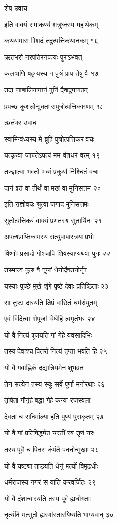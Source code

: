 शेष उवाच

इति वाक्यं समाकर्ण्य शत्रुघ्नस्य महार्थकम्

कथयामास विशदं तदुत्पत्तिकथानकम् १६

ऋतंभरो नरपतिरनपत्यः पुराऽभवत्

कलत्राणि बहून्यस्य न पुत्रं प्राप तेषु वै १७

तदा जाबालिनामानं मुनिं दैवादुपागतम्

प्रपच्छ कुशलोद्युक्तः सपुत्रोत्पत्तिकारणम् १८

ऋतंभर उवाच

स्वामिन्वंध्यस्य मे ब्रूहि पुत्रोत्पत्तिकरं वचः

यत्कृत्वा जायतेऽपत्यं मम वंशधरं वरम् १९

तज्ज्ञात्वा भवतो भव्यं प्रकुर्यां निश्चितं वचः

दानं व्रतं वा तीर्थं वा मखं वा मुनिसत्तम २०

इति राज्ञोवचः श्रुत्वा जगाद मुनिसत्तमः

सुतोत्पत्तिकरं वाक्यं प्रणतस्य सुतार्थिनः २१

अपत्यप्राप्तिकामस्य संत्युपायास्त्रयः प्रभो

विष्णोः प्रसादो गोश्चापि शिवस्याप्यथवा पुनः २२

तस्मात्त्वं कुरु वै पूजां धेनोर्देवतनोर्नृप

यस्याः पुच्छे मुखे शृंगे पृष्ठे देवाः प्रतिष्ठिताः २३

सा तुष्टा दास्यति क्षिप्रं वांछितं धर्मसंयुतम्

एवं विदित्वा गोपूजां विधेहि त्वमृतंभर २४

यो वै नित्यं पूजयति गां गेहे यवसादिभिः

तस्य देवाश्च पितरो नित्यं तृप्ता भवंति हि २५

यो वै गवाह्निकं दद्यान्नियमेन शुभव्रतः

तेन सत्येन तस्य स्युः सर्वे पूर्णा मनोरथाः २६

तृषिता गौर्गृहे बद्धा गेहे कन्या रजस्वला

देवता च सनिर्माल्या हंति पुण्यं पुराकृतम् २७

यो वै गां प्रतिषिद्ध्येत चरंतीं स्वं तृणं नरः

तस्य पूर्वे च पितरः कंपंते पतनोन्मुखाः २८

यो वै यष्ट्या ताडयति धेनुं मर्त्यो विमूढधीः

धर्मराजस्य नगरं स याति करवर्जितः २९

यो वै दंशान्वारयति तस्य पूर्वे ह्यधोगताः

नृत्यंति मत्सुतो ह्यस्मांस्तारयिष्यति भाग्यवान् ३०

